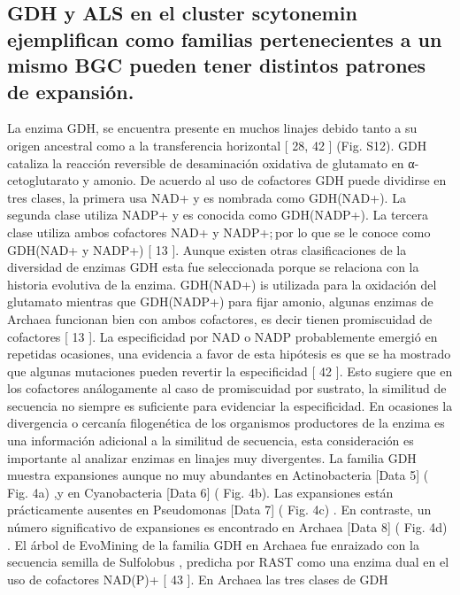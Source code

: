 \documentclass[12pt,twoside]{reedthesis}
\begin{document}
  \subsection{GDH y ALS en el cluster scytonemin ejemplifican como
  familias pertenecientes a un mismo BGC pueden tener distintos patrones
  de
  expansión.}\label{gdh-y-als-en-el-cluster-scytonemin-ejemplifican-como-familias-pertenecientes-a-un-mismo-bgc-pueden-tener-distintos-patrones-de-expansion.}
  
  La enzima GDH, se encuentra presente en muchos linajes debido tanto a su
  origen ancestral como a la transferencia horizontal {[} 28, 42 {]} (Fig.
  S12). GDH cataliza la reacción reversible de desaminación oxidativa de
  glutamato en α-cetoglutarato y amonio. De acuerdo al uso de cofactores
  GDH puede dividirse en tres clases, la primera usa NAD+ y es nombrada
  como GDH(NAD+). La segunda clase utiliza NADP+ y es conocida como
  GDH(NADP+). La tercera clase utiliza ambos cofactores NAD+ y NADP+; por
  lo que se le conoce como GDH(NAD+ y NADP+) {[} 13 {]}. Aunque existen
  otras clasificaciones de la diversidad de enzimas GDH esta fue
  seleccionada porque se relaciona con la historia evolutiva de la enzima.
  GDH(NAD+) is utilizada para la oxidación del glutamato mientras que
  GDH(NADP+) para fijar amonio, algunas enzimas de Archaea funcionan bien
  con ambos cofactores, es decir tienen promiscuidad de cofactores {[} 13
  {]}. La especificidad por NAD o NADP probablemente emergió en repetidas
  ocasiones, una evidencia a favor de esta hipótesis es que se ha mostrado
  que algunas mutaciones pueden revertir la especificidad {[} 42 {]}. Esto
  sugiere que en los cofactores análogamente al caso de promiscuidad por
  sustrato, la similitud de secuencia no siempre es suficiente para
  evidenciar la especificidad. En ocasiones la divergencia o cercanía
  filogenética de los organismos productores de la enzima es una
  información adicional a la similitud de secuencia, esta consideración es
  importante al analizar enzimas en linajes muy divergentes. La familia
  GDH muestra expansiones aunque no muy abundantes en Actinobacteria
  {[}Data 5{]} ( Fig. 4a) ,y en Cyanobacteria {[}Data 6{]} ( Fig. 4b). Las
  expansiones están prácticamente ausentes en Pseudomonas {[}Data 7{]} (
  Fig. 4c) . En contraste, un número significativo de expansiones es
  encontrado en Archaea {[}Data 8{]} ( Fig. 4d) . El árbol de EvoMining de
  la familia GDH en Archaea fue enraizado con la secuencia semilla de
  Sulfolobus , predicha por RAST como una enzima dual en el uso de
  cofactores NAD(P)+ {[} 43 {]}. En Archaea las tres clases de GDH
\end{document}
